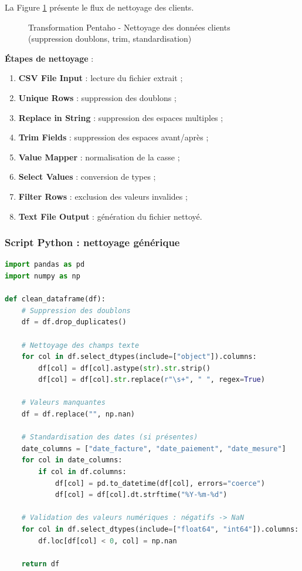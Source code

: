 \documentclass[12pt,a4paper]{report}
\begin{document}
La Figure \ref{fig:nettoyage_clients} présente le flux de nettoyage des clients.

\begin{figure}[H]
    \centering
    \caption{Transformation Pentaho - Nettoyage des données clients (suppression doublons, trim, standardisation)}
    \label{fig:nettoyage_clients}
\end{figure}

\textbf{Étapes de nettoyage} :
\begin{enumerate}
    \item \textbf{CSV File Input} : lecture du fichier extrait ;
    \item \textbf{Unique Rows} : suppression des doublons ;
    \item \textbf{Replace in String} : suppression des espaces multiples ;
    \item \textbf{Trim Fields} : suppression des espaces avant/après ;
    \item \textbf{Value Mapper} : normalisation de la casse ;
    \item \textbf{Select Values} : conversion de types ;
    \item \textbf{Filter Rows} : exclusion des valeurs invalides ;
    \item \textbf{Text File Output} : génération du fichier nettoyé.
\end{enumerate}

\subsubsection{Script Python : nettoyage générique}

\begin{lstlisting}[language=Python, caption=Fonction de nettoyage générique (principe)]
import pandas as pd
import numpy as np

def clean_dataframe(df):
    # Suppression des doublons
    df = df.drop_duplicates()

    # Nettoyage des champs texte
    for col in df.select_dtypes(include=["object"]).columns:
        df[col] = df[col].astype(str).str.strip()
        df[col] = df[col].str.replace(r"\s+", " ", regex=True)

    # Valeurs manquantes
    df = df.replace("", np.nan)

    # Standardisation des dates (si présentes)
    date_columns = ["date_facture", "date_paiement", "date_mesure"]
    for col in date_columns:
        if col in df.columns:
            df[col] = pd.to_datetime(df[col], errors="coerce")
            df[col] = df[col].dt.strftime("%Y-%m-%d")

    # Validation des valeurs numériques : négatifs -> NaN
    for col in df.select_dtypes(include=["float64", "int64"]).columns:
        df.loc[df[col] < 0, col] = np.nan

    return df
\end{lstlisting}
\end{document}
